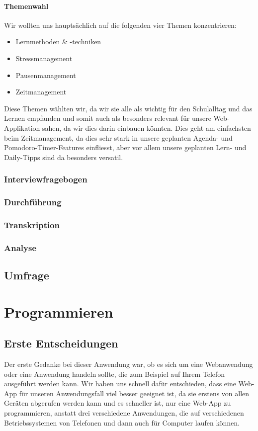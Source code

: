 \documentclass[12pt,a4paper]{report}
\begin{document}
\subsubsection {Themenwahl}
Wir wollten uns hauptsächlich auf die folgenden vier Themen konzentrieren:
\begin{itemize}
    \item Lernmethoden \& -techniken
    \item Stressmanagement
    \item Pausenmanagement
    \item Zeitmanagement
\end{itemize}

Diese Themen wählten wir, da wir sie alle als wichtig für den Schulalltag und das Lernen empfanden und somit auch als besonders relevant für unsere Web-Applikation sahen,
da wir dies darin einbauen könnten. Dies geht am einfachsten beim Zeitmanagement, da dies sehr stark in unsere geplanten Agenda- und Pomodoro-Timer-Features einfliesst, aber vor allem unsere geplanten Lern- und Daily-Tipps sind da besonders versatil.

\subsection {Interviewfragebogen}

\subsection {Durchführung}

\subsection {Transkription}

\subsection {Analyse}

\section{Umfrage}


\chapter{Programmieren}
\section{Erste Entscheidungen}
Der erste Gedanke bei dieser Anwendung war, ob es sich um eine Webanwendung oder eine Anwendung handeln sollte, die zum Beispiel auf Ihrem Telefon ausgeführt werden kann. Wir haben uns schnell dafür entschieden, dass eine Web-App für unseren Anwendungsfall viel besser geeignet ist, da sie erstens von allen Geräten abgerufen werden kann und es schneller ist, nur eine Web-App zu programmieren, anstatt drei verschiedene Anwendungen, die auf verschiedenen Betriebssystemen von Telefonen und dann auch für Computer laufen können.
\end{document}
